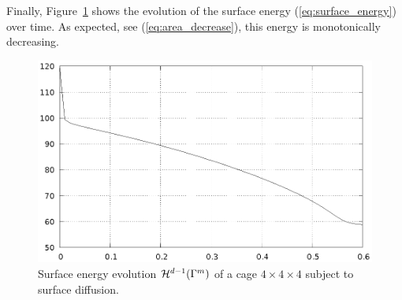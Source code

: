 Finally, Figure~\ref{fig:sd_cage_energy} shows the evolution of the surface
energy (\ref{eq:surface_energy}) over time. As expected, see
(\ref{eq:area_decrease}), this energy is monotonically decreasing.

\begin{figure}[htbp]
\centering
\includegraphics[width=.45\textwidth]
{figures/geometric_pdes/sd_cage_energy.ps}
\caption[Surface diffusion cage surface energy]{Surface energy evolution
$\mathcal{H}^{d-1}(\Gamma^m)$ of a cage $4 \times 4 \times 4$ subject to surface
diffusion.}
\label{fig:sd_cage_energy}
\end{figure}
